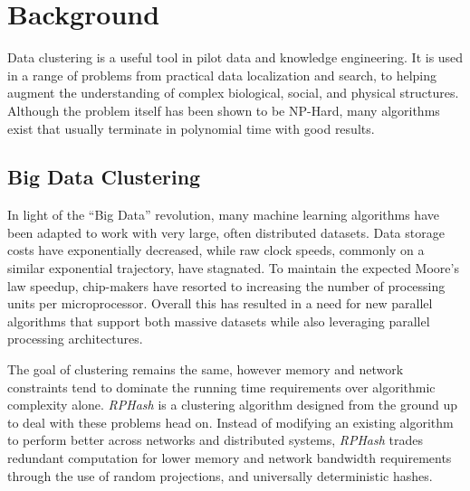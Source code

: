 \documentclass[a4paper,10pt]{article}
\begin{document}
\section{Background} Data clustering is a useful tool in pilot data and
knowledge engineering.	It is used in a range of problems from practical
data localization and search, to helping augment the understanding of complex
biological, social, and physical structures.  Although the problem itself has
been shown to be NP-Hard\cite{dasgupta08,Mahajan09}, many algorithms exist that
usually terminate in polynomial time with good results.  
\subsection{Big Data Clustering} In light of the ``Big Data'' revolution, many 
machine learning algorithms have been adapted to work with very large, often
distributed datasets.
Data storage costs have exponentially decreased, while raw clock speeds, 
commonly on a similar exponential trajectory, have stagnated\cite{cownie}. To 
maintain the expected Moore's law speedup, chip-makers have resorted to 
increasing the number of processing units per microprocessor. Overall this has 
resulted in a need for new parallel algorithms that support both massive 
datasets while also leveraging parallel processing architectures.

The goal of clustering remains the same, however memory and network constraints 
tend to dominate the running time requirements over algorithmic complexity 
alone. \emph{RPHash} is a clustering algorithm designed from the ground up to 
deal with these problems head on.  Instead of modifying an existing algorithm 
to perform better across networks and distributed systems, \emph{RPHash} trades
redundant computation for lower memory and network bandwidth requirements
through the use of random projections, and universally deterministic hashes.
\end{document}
